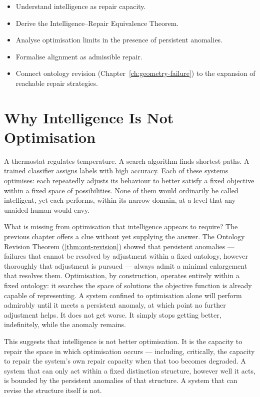 \documentclass[12pt,twoside,openright]{book}
\newenvironment{objectives}{%
  \begin{tcolorbox}[colback=DistBlue!5,colframe=DistBlue,
    title={\faCheckCircle\enspace Learning Objectives},
    fonttitle=\sffamily\bfseries\color{white},
    attach boxed title to top left={yshift=-2mm,xshift=4mm},
    boxed title style={colback=DistBlue},breakable]
  \begin{itemize}[leftmargin=*,nosep]}{%
  \end{itemize}\end{tcolorbox}\vspace{1em}}
\begin{document}
\begin{objectives}
  \item Understand intelligence as repair capacity.
  \item Derive the Intelligence--Repair Equivalence
        Theorem.
  \item Analyse optimisation limits in the presence of
        persistent anomalies.
  \item Formalise alignment as admissible repair.
  \item Connect ontology revision (Chapter~\ref{ch:geometry-failure})
        to the expansion of reachable repair strategies.
\end{objectives}

\section{Why Intelligence Is Not Optimisation}
\label{sec:ch9-why-not-optimisation}

A thermostat regulates temperature. A search algorithm finds
shortest paths. A trained classifier assigns labels with
high accuracy. Each of these systems optimises: each
repeatedly adjusts its behaviour to better satisfy a fixed
objective within a fixed space of possibilities. None of
them would ordinarily be called intelligent, yet each
performs, within its narrow domain, at a level that any
unaided human would envy.

What is missing from optimisation that intelligence appears
to require? The previous chapter offers a clue without yet
supplying the answer. The Ontology Revision Theorem
(\cref{thm:ont-revision}) showed that persistent anomalies
--- failures that cannot be resolved by adjustment within a
fixed ontology, however thoroughly that adjustment is
pursued --- always admit a minimal enlargement that resolves
them. Optimisation, by construction, operates entirely
within a fixed ontology: it searches the space of solutions
the objective function is already capable of representing. A
system confined to optimisation alone will perform admirably
until it meets a persistent anomaly, at which point no
further adjustment helps. It does not get worse. It simply
stops getting better, indefinitely, while the anomaly
remains.

This suggests that intelligence is not better optimisation.
It is the capacity to repair the space in which optimisation
occurs --- including, critically, the capacity to repair the
system's own repair capacity when that too becomes degraded.
A system that can only act within a fixed distinction
structure, however well it acts, is bounded by the
persistent anomalies of that structure. A system that can
revise the structure itself is not.
\end{document}
